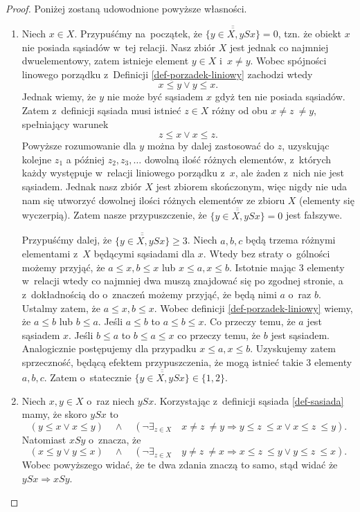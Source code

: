 \documentclass[12pt,a4paper]{report}
\newcommand{\licznosc}[1]{\overline{\overline{#1}}}
\begin{document}
\begin{proof}
Poniżej zostaną udowodnione powyższe własności.
\begin{enumerate}
\item Niech $x \in X$. Przypuśćmy na~początek, że $\licznosc{\{y \in X, ySx\}} = 0$, tzn. że obiekt $x$ nie posiada sąsiadów w~tej relacji. Nasz zbiór $X$ jest jednak co najmniej dwuelementowy, zatem istnieje element $y \in X$ i~$ x \neq y$. Wobec spójności linowego porządku z~Definicji \ref{def-porzadek-liniowy} zachodzi wtedy
$$ x \leq y \lor y \leq x.$$
Jednak wiemy, że $y$ nie może być sąsiadem $x$ gdyż ten nie posiada sąsiadów. Zatem z~definicji sąsiada musi istnieć $z \in X$ różny od obu $x \neq z~\neq y$, spełniający warunek
$$
z \leq x \lor x \leq z.
$$
Powyższe rozumowanie dla $y$ można by dalej zastosować do $z$, uzyskując kolejne $z_1$ a później $z_2,z_3, \ldots$ dowolną ilość różnych elementów, z~których każdy występuje w~relacji liniowego porządku z~$x$, ale żaden z~nich nie jest sąsiadem. Jednak nasz zbiór $X$ jest zbiorem skończonym, więc nigdy nie uda nam się utworzyć dowolnej ilości różnych elementów ze zbioru $X$ (elementy się wyczerpią). Zatem nasze przypuszczenie, że $\licznosc{\{y \in X, ySx\}} = 0$ jest fałszywe.

Przypuśćmy dalej, że $\licznosc{\{y \in X, ySx\}} \geq 3$. Niech $a,b,c$ będą trzema różnymi elementami z~$X$ będącymi sąsiadami dla $x$. Wtedy bez straty o~gólności możemy przyjąć, że $a \leq x, b \leq x$ lub $x \leq a, x \leq b$. Istotnie mając 3 elementy w~relacji wtedy co najmniej dwa muszą znajdować się po zgodnej stronie, a z~dokładnością do o~znaczeń możemy przyjąć, że będą nimi $a$ o~raz $b$. Ustalmy zatem, że $a \leq x, b \leq x$. Wobec definicji \ref{def-porzadek-liniowy} wiemy, że $a \leq b$ lub $b \leq a$. Jeśli $a \leq b$ to $a \leq b \leq x$. Co przeczy temu, że $a$ jest sąsiadem $x$. Jeśli $b \leq a$ to $b \leq a \leq x$ co przeczy temu, że $b$ jest sąsiadem. Analogicznie postępujemy dla przypadku $x \leq a, x \leq b$. Uzyskujemy zatem sprzeczność, będącą efektem przypuszczenia, że mogą istnieć takie 3 elementy $a,b,c$. Zatem o~statecznie $\licznosc{\{y \in X, ySx\}} \in \{ 1,2 \}$.

\item Niech $x,y \in X$ o~raz niech $ySx$. Korzystając z~definicji sąsiada \ref{def-sasiada} mamy, że skoro $ySx$ to  $$\left(y \leq x \lor x\leq y \right)\quad \land \quad  \left(\lnot \exists_{z \in X}  \quad x\neq z~\neq y \Rightarrow   y \leq z~\leq x \lor x \leq z~\leq y \right).$$ 
Natomiast $xSy$ o~znacza, że 
$$\left(x \leq y \lor y\leq x \right)\quad \land \quad  \left(\lnot \exists_{z \in X}  \quad y\neq z~\neq x \Rightarrow   x \leq z~\leq y \lor y \leq z~\leq x \right).$$ 
Wobec powyższego widać, że te dwa zdania znaczą to samo, stąd widać że  $ySx \Rightarrow xSy$. %


\end{enumerate}
\end{proof}
\end{document}
